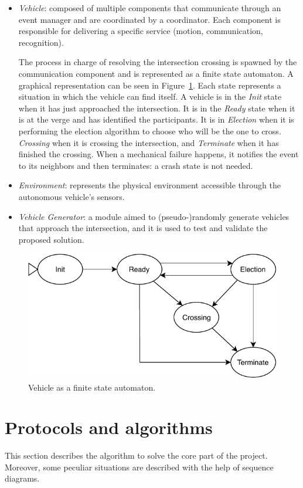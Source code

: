 \documentclass{memoir}
\begin{document}
\begin{itemize}
	\item \emph{Vehicle}: composed of multiple components that communicate through an event manager and are coordinated by a coordinator. Each component is responsible for delivering a specific service (motion, communication, recognition). 
	
The process in charge of resolving the intersection crossing is spawned by the communication component and is represented as a finite state automaton. A graphical representation can be seen in Figure~\ref{fig:vehicle-automaton}. Each state represents a situation in which the vehicle can find itself. A vehicle is in the \emph{Init} state when it has just approached the intersection. It is in the \emph{Ready} state when it is at the verge and has identified the participants. It is in \emph{Election} when it is performing the election algorithm to choose who will be the one to cross. \emph{Crossing} when it is crossing the intersection, and \emph{Terminate} when it has finished the crossing. When a mechanical failure happens, it notifies the event to its neighbors and then terminates: a crash state is not needed.
	\item \emph{Environment}: represents the physical environment accessible through the autonomous vehicle's sensors.
	\item \emph{Vehicle Generator}: a module aimed to (pseudo-)randomly generate vehicles that approach the intersection, and it is used to test and validate the proposed solution.
\end{itemize}

\begin{figure}
	\centering
	\includegraphics[width=0.8\linewidth]{vehicle_automaton.pdf}
	\caption{Vehicle as a finite state automaton.}
	\label{fig:vehicle-automaton}
\end{figure}

\section{Protocols and algorithms}
This section describes the algorithm to solve the core part of the project. Moreover, some peculiar situations are described with the help of sequence diagrams.
\end{document}

